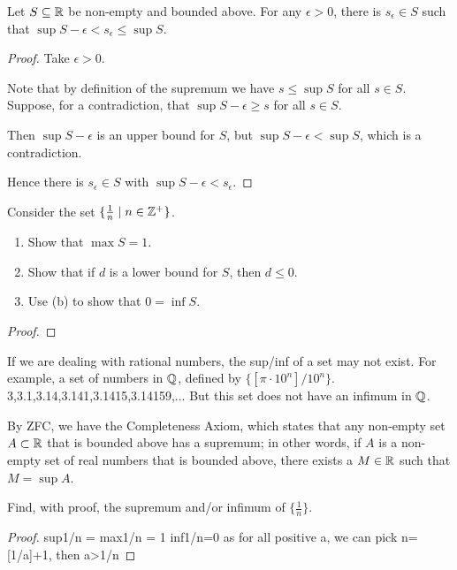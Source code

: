\begin{proposition}
Let $S \subseteq \mathbb R$ be non-empty and bounded above. For any $\epsilon > 0$, there is $s_\epsilon \in S$ such that $\sup S-\epsilon < s_\epsilon \le \sup S$.
\end{proposition}
\begin{proof}
Take $\epsilon > 0$.

Note that by definition of the supremum we have $s \le \sup S$ for all $s \in S$. Suppose, for a contradiction, that $\sup S-\epsilon \ge s$ for all $s \in S$.

Then $\sup S-\epsilon$ is an upper bound for $S$, but $\sup S-\epsilon < \sup S$, which is a contradiction.

Hence there is $s_\epsilon \in S$ with $\sup S-\epsilon<s_\epsilon$.
\end{proof}

\begin{prbm}
Consider the set $\{\frac{1}{n} \mid n\in\mathbb Z^{+}\}$.
\begin{enumerate}[label=(\alph*)]
\item Show that $\max S = 1$.
\item Show that if $d$ is a lower bound for $S$, then $d \le 0$.
\item Use (b) to show that $0 = \inf S$.
\end{enumerate}
\end{prbm}

\begin{proof}

\end{proof}

If we are dealing with rational numbers, the sup/inf of a set may not exist. For example, a set of numbers in $\mathbb Q$, defined by $\{[\pi\cdot10^n]/10^n\}$.
3,3.1,3.14,3.141,3.1415,3.14159,...
But this set does not have an infimum in $\mathbb Q$.

By ZFC, we have the Completeness Axiom, which states that any non-empty set $A \subset \mathbb R$ that is bounded above has a supremum; in other words, if $A$ is a non-empty set of real numbers that is bounded above, there exists a $M \in \mathbb R$ such that $M = \sup A$.




\begin{prbm}
Find, with proof, the supremum and/or infimum of $\{\frac{1}{n}\}$.
\end{prbm}

\begin{proof}
sup{1/n} = max{1/n} = 1
inf{1/n}=0 as for all positive a, we can pick n=[1/a]+1, then a>1/n
\end{proof}

